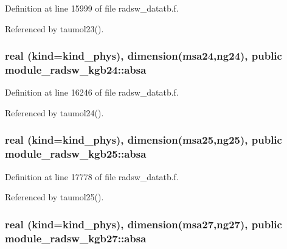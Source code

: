 Definition at line 15999 of file radsw\+\_\+datatb.\+f.



Referenced by taumol23().

\subsubsection[{\texorpdfstring{absa}{absa}}]{\setlength{\rightskip}{0pt plus 5cm}real (kind=kind\+\_\+phys), dimension(msa24,ng24), public module\+\_\+radsw\+\_\+kgb24\+::absa}\hypertarget{group__module__radsw__main_ga06965ec156c4e1d18d50a70ba43bd8e1}{}\label{group__module__radsw__main_ga06965ec156c4e1d18d50a70ba43bd8e1}


Definition at line 16246 of file radsw\+\_\+datatb.\+f.



Referenced by taumol24().

\subsubsection[{\texorpdfstring{absa}{absa}}]{\setlength{\rightskip}{0pt plus 5cm}real (kind=kind\+\_\+phys), dimension(msa25,ng25), public module\+\_\+radsw\+\_\+kgb25\+::absa}\hypertarget{group__module__radsw__main_gaf4daf474954d4689219ada6d0662aceb}{}\label{group__module__radsw__main_gaf4daf474954d4689219ada6d0662aceb}


Definition at line 17778 of file radsw\+\_\+datatb.\+f.



Referenced by taumol25().

\subsubsection[{\texorpdfstring{absa}{absa}}]{\setlength{\rightskip}{0pt plus 5cm}real (kind=kind\+\_\+phys), dimension(msa27,ng27), public module\+\_\+radsw\+\_\+kgb27\+::absa}\hypertarget{group__module__radsw__main_ga300726e54369a14bfbe6b486f5aab01b}{}\label{group__module__radsw__main_ga300726e54369a14bfbe6b486f5aab01b}


